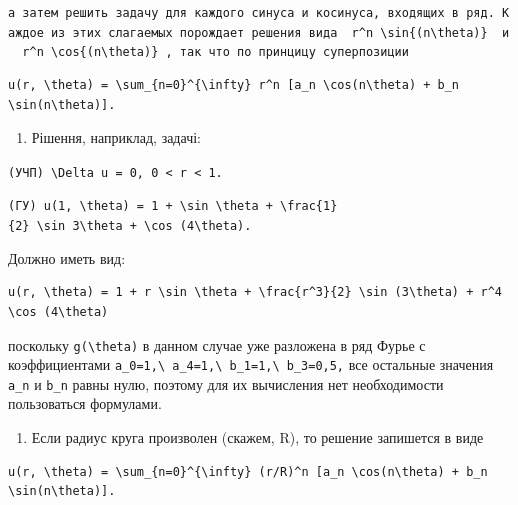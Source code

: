 \documentclass[
  ukrainian,
]{article}
\providecommand{\tightlist}{%
  \setlength{\itemsep}{0pt}\setlength{\parskip}{0pt}}
\begin{document}
\texttt{а\ затем\ решить\ задачу\ для\ каждого\ синуса\ и\ косинуса,\ входящих\ в\ ряд.\ Каждое\ из\ этих\ слагаемых\ порождает\ решения\ вида\ \ \textquotesingle{}r\^{}n\ \textbackslash{}sin\{(n\textbackslash{}theta)\}\textquotesingle{}\ \ и\ \ \textquotesingle{}r\^{}n\ \textbackslash{}cos\{(n\textbackslash{}theta)\}\textquotesingle{}\ ,\ так\ что\ по\ принцицу\ суперпозиции}

\begin{verbatim}
u(r, \theta) = \sum_{n=0}^{\infty} r^n [a_n \cos(n\theta) + b_n \sin(n\theta)].
\end{verbatim}

\begin{enumerate}
\def\labelenumi{\arabic{enumi}.}
\setcounter{enumi}{1}
\tightlist
\item
  Рішення, наприклад, задачі:
\end{enumerate}

\texttt{(УЧП)\ \textquotesingle{}\textbackslash{}Delta\ u\ =\ 0\textquotesingle{},\ \textquotesingle{}0\ \textless{}\ r\ \textless{}\ 1\textquotesingle{}.}

\texttt{(ГУ)\ \textquotesingle{}u(1,\ \textbackslash{}theta)\ =\ 1\ +\ \textbackslash{}sin\ \textbackslash{}theta\ +\ \textbackslash{}frac\{1\}\{2\}\ \textbackslash{}sin\ 3\textbackslash{}theta\ +\ \textbackslash{}cos\ (4\textbackslash{}theta)\textquotesingle{}.}

Должно иметь вид:

\begin{verbatim}
u(r, \theta) = 1 + r \sin \theta + \frac{r^3}{2} \sin (3\theta) + r^4 \cos (4\theta)
\end{verbatim}

поскольку \texttt{g(\textbackslash{}theta)} в данном случае уже
разложена в ряд Фурье с коэффициентами
\texttt{a\_0=1,\textbackslash{}\ a\_4=1,\textbackslash{}\ b\_1=1,\textbackslash{}\ b\_3=0,5,}
все остальные значения \texttt{a\_n} и \texttt{b\_n} равны нулю, поэтому
для их вычисления нет необходимости пользоваться формулами.

\begin{enumerate}
\def\labelenumi{\arabic{enumi}.}
\setcounter{enumi}{2}
\tightlist
\item
  Если радиус круга произволен (скажем, R), то решение запишется в виде
\end{enumerate}

\begin{verbatim}
u(r, \theta) = \sum_{n=0}^{\infty} (r/R)^n [a_n \cos(n\theta) + b_n \sin(n\theta)].
\end{verbatim}
\end{document}
